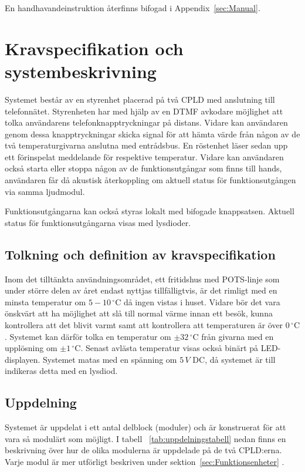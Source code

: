 \documentclass[a4paper,11pt]{article}
\begin{document}
	En handhavandeinstruktion återfinns bifogad i Appendix~\ref{sec:Manual}.

\pagebreak

\section{Kravspecifikation och systembeskrivning}
	Systemet består av en styrenhet placerad på två CPLD med anslutning till telefonnätet. Styrenheten har med hjälp av en DTMF avkodare möjlighet att tolka användarens telefonknapptryckningar på distans. Vidare kan användaren genom dessa knapptryckningar skicka signal för att hämta värde från någon av de två temperaturgivarna anslutna med entrådsbus. En röstenhet läser sedan upp ett förinspelat meddelande för respektive temperatur. Vidare kan användaren också starta eller stoppa någon av de funktionsutgångar som finns till hands, användaren får då akustisk återkoppling om aktuell status för funktionsutgången via samma ljudmodul.

Funktionsutgångarna kan också styras lokalt med bifogade knappsatsen. Aktuell status för funktionsutgångarna visas med lysdioder. 

	\subsection{Tolkning och definition av kravspecifikation}

		Inom det tilltänkta användningsområdet, ett fritidshus med POTS-linje som under större delen av året endast nyttjas tillfälligtvis, är det rimligt med en minsta temperatur om $5-10\,^{\circ}\mathrm{C}$ då ingen vistas i huset. Vidare bör det vara önskvärt att ha möjlighet att slå till normal värme innan ett besök, kunna kontrollera att det blivit varmt samt att kontrollera att temperaturen är över $0\,^{\circ}\mathrm{C}$. Systemet kan därför tolka en temperatur om $\pm 32\,^{\circ}\mathrm{C}$ från givarna med en upplösning om $\pm 1\,^{\circ}\mathrm{C}$. Senast avlästa temperatur visas också binärt på LED-displayen. Systemet matas med en spänning om $5\,V$ DC, då systemet är till indikeras detta med en lysdiod.

	\subsection{Uppdelning}

	Systemet är uppdelat i ett antal delblock (moduler) och är konstruerat för att vara så modulärt som möjligt.
	I tabell ~\ref{tab:uppdelningstabell} nedan finns en beskrivning över hur de olika modulerna är uppdelade på de två CPLD:erna. Varje modul är mer
	utförligt beskriven under sektion~\ref{sec:Funktionsenheter} . 
\end{document}

